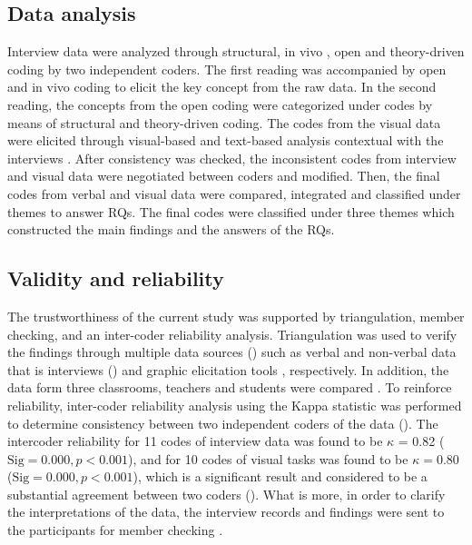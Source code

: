 \documentclass[output=paper]{../langscibook}
\begin{document}
\subsection{Data analysis}



Interview data were analyzed through structural, in vivo \citep{Saldaña2013}, open and theory-driven coding \citep{DeCuirGunbyEtAl2011} by two independent coders.  The first reading was accompanied by open and in vivo coding to elicit the key concept from the raw data. In the second reading, the concepts from the open coding were categorized under codes by means of structural and theory-driven coding. The codes from the visual data were elicited through visual-based and text-based analysis contextual with the interviews \citep{Bagnoli2009}. After consistency was checked, the inconsistent codes from interview and visual data were negotiated between coders and modified. Then, the final codes from verbal and visual data were compared, integrated and classified under themes to answer RQs. The final codes were classified under three themes which constructed the main findings and the answers of the RQs.



\subsection{Validity and reliability}



The trustworthiness of the current study was supported by triangulation, member checking, and an inter-coder reliability analysis. Triangulation was used to verify the findings through multiple data sources (\citealt{MilesEtAl2014}) such as verbal and non-verbal data that is interviews (\citealt{FraenkleWallen2009}) and graphic elicitation tools \citep{Bagnoli2009}, respectively. In addition, the data form three classrooms, teachers and students were compared \citep{MilesEtAl2014}. To reinforce reliability, inter-coder reliability analysis using the Kappa statistic was performed to determine consistency between two independent coders of the data (\citealt{LandisKoch1977}). The intercoder reliability for 11 codes of interview data was found to be $\kappa$ = 0.82 ($\text{Sig} = 0.000, p < 0.001$), and for 10 codes of visual tasks was found to be $\kappa = 0.80$ ($\text{Sig}= 0.000, p < 0.001$), which is a significant result and considered to be a substantial agreement between two coders (\citealt{VieraGarrett2005}). What is more, in order to clarify the interpretations of the data, the interview records and findings were sent to the participants for member checking \citep{Sandelowski1993}.
\end{document}
